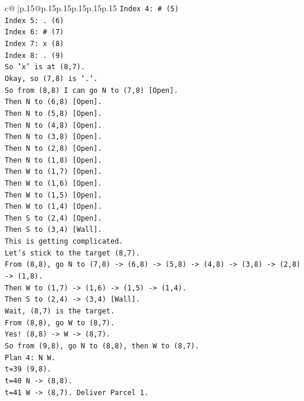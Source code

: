 \documentclass{article}
\begin{document}
{\begin{supertabular}{c@{$\;$}|p{.15\linewidth}@{}p{.15\linewidth}p{.15\linewidth}p{.15\linewidth}p{.15\linewidth}p{.15\linewidth}}
{{{\texttt{Index 4: \# (5)} \\
\texttt{Index 5: . (6)} \\
\texttt{Index 6: \# (7)} \\
\texttt{Index 7: x (8)} \\
\texttt{Index 8: . (9)} \\
\texttt{So 'x' is at (8,7).} \\
\texttt{Okay, so (7,8) is `.`.} \\
\texttt{So from (8,8) I can go N to (7,8) {[}Open{]}.} \\
\texttt{Then N to (6,8) {[}Open{]}.} \\
\texttt{Then N to (5,8) {[}Open{]}.} \\
\texttt{Then N to (4,8) {[}Open{]}.} \\
\texttt{Then N to (3,8) {[}Open{]}.} \\
\texttt{Then N to (2,8) {[}Open{]}.} \\
\texttt{Then N to (1,8) {[}Open{]}.} \\
\texttt{Then W to (1,7) {[}Open{]}.} \\
\texttt{Then W to (1,6) {[}Open{]}.} \\
\texttt{Then W to (1,5) {[}Open{]}.} \\
\texttt{Then W to (1,4) {[}Open{]}.} \\
\texttt{Then S to (2,4) {[}Open{]}.} \\
\texttt{Then S to (3,4) {[}Wall{]}.} \\
\texttt{This is getting complicated.} \\
\texttt{Let's stick to the target (8,7).} \\
\texttt{From (8,8), go N to (7,8) {-}> (6,8) {-}> (5,8) {-}> (4,8) {-}> (3,8) {-}> (2,8) {-}> (1,8).} \\
\texttt{Then W to (1,7) {-}> (1,6) {-}> (1,5) {-}> (1,4).} \\
\texttt{Then S to (2,4) {-}> (3,4) {[}Wall{]}.} \\
\texttt{Wait, (8,7) is the target.} \\
\texttt{From (8,8), go W to (8,7).} \\
\texttt{Yes! (8,8) {-}> W {-}> (8,7).} \\
\texttt{So from (9,8), go N to (8,8), then W to (8,7).} \\
\texttt{Plan 4: N W.} \\
\texttt{t=39 (9,8).} \\
\texttt{t=40 N {-}> (8,8).} \\
\texttt{t=41 W {-}> (8,7). Deliver Parcel 1.} \\
}}}
\end{supertabular}}
\end{document}
